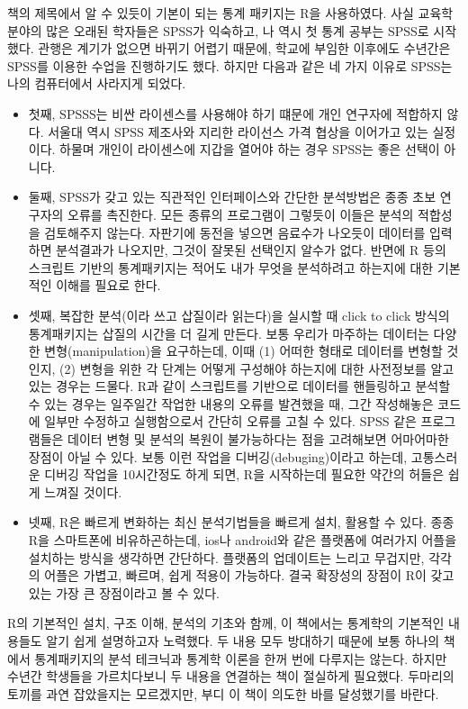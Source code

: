 \documentclass[
]{book}
\theoremstyle{definition}
\theoremstyle{definition}
\theoremstyle{definition}
\theoremstyle{definition}
\theoremstyle{remark}
\begin{document}
책의 제목에서 알 수 있듯이 기본이 되는 통계 패키지는 R을 사용하였다. 사실 교육학 분야의 많은 오래된 학자들은 SPSS가 익숙하고, 나 역시 첫 통계 공부는 SPSS로 시작했다. 관행은 계기가 없으면 바뀌기 어렵기 때문에, 학교에 부임한 이후에도 수년간은 SPSS를 이용한 수업을 진행하기도 했다. 하지만 다음과 같은 네 가지 이유로 SPSS는 나의 컴퓨터에서 사라지게 되었다.

\begin{itemize}
\item
  첫째, SPSSS는 비싼 라이센스를 사용해야 하기 떄문에 개인 연구자에 적합하지 않다. 서울대 역시 SPSS 제조사와 지리한 라이선스 가격 협상을 이어가고 있는 실정이다. 하물며 개인이 라이센스에 지갑을 열어야 하는 경우 SPSS는 좋은 선택이 아니다.
\item
  둘째, SPSS가 갖고 있는 직관적인 인터페이스와 간단한 분석방법은 종종 초보 연구자의 오류를 촉진한다. 모든 종류의 프로그램이 그렇듯이 이들은 분석의 적합성을 검토해주지 않는다. 자판기에 동전을 넣으면 음료수가 나오듯이 데이터를 입력하면 분석결과가 나오지만, 그것이 잘못된 선택인지 알수가 없다. 반면에 R 등의 스크립트 기반의 통계패키지는 적어도 내가 무엇을 분석하려고 하는지에 대한 기본적인 이해를 필요로 한다.
\item
  셋째, 복잡한 분석(이라 쓰고 삽질이라 읽는다)을 실시할 때 click to click 방식의 통계패키지는 삽질의 시간을 더 길게 만든다. 보통 우리가 마주하는 데이터는 다양한 변형(manipulation)을 요구하는데, 이때 (1) 어떠한 형태로 데이터를 변형할 것인지, (2) 변형을 위한 각 단계는 어떻게 구성해야 하는지에 대한 사전정보를 알고 있는 경우는 드물다. R과 같이 스크립트를 기반으로 데이터를 핸들링하고 분석할 수 있는 경우는 일주일간 작업한 내용의 오류를 발견했을 때, 그간 작성해놓은 코드에 일부만 수정하고 실행함으로서 간단히 오류를 고칠 수 있다. SPSS 같은 프로그램들은 데이터 변형 및 분석의 복원이 불가능하다는 점을 고려해보면 어마어마한 장점이 아닐 수 있다. 보통 이런 작업을 디버깅(debuging)이라고 하는데, 고통스러운 디버깅 작업을 10시간정도 하게 되면, R을 시작하는데 필요한 약간의 허들은 쉽게 느껴질 것이다.
\item
  넷째, R은 빠르게 변화하는 최신 분석기법들을 빠르게 설치, 활용할 수 있다. 종종 R을 스마트폰에 비유하곤하는데, ios나 android와 같은 플랫폼에 여러가지 어플을 설치하는 방식을 생각하면 간단하다. 플랫폼의 업데이트는 느리고 무겁지만, 각각의 어플은 가볍고, 빠르며, 쉽게 적용이 가능하다. 결국 확장성의 장점이 R이 갖고 있는 가장 큰 장점이라고 볼 수 있다.
\end{itemize}

R의 기본적인 설치, 구조 이해, 분석의 기초와 함께, 이 책에서는 통계학의 기본적인 내용들도 알기 쉽게 설명하고자 노력했다. 두 내용 모두 방대하기 때문에 보통 하나의 책에서 통계패키지의 분석 테크닉과 통계학 이론을 한꺼 번에 다루지는 않는다. 하지만 수년간 학생들을 가르치다보니 두 내용을 연결하는 책이 절실하게 필요했다. 두마리의 토끼를 과연 잡았을지는 모르겠지만, 부디 이 책이 의도한 바를 달성했기를 바란다.
\end{document}
